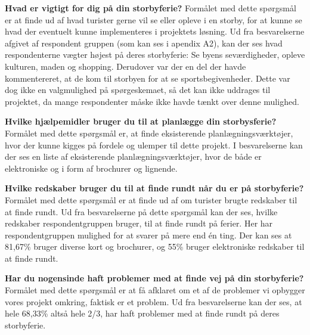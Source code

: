 \textbf{Hvad er vigtigt for dig på din storbyferie?}\newline
Formålet med dette spørgsmål er at finde ud af hvad turister gerne vil se eller opleve i en storby, for at kunne se hvad der eventuelt kunne implementeres i projektets løsning.\newline
Ud fra besvarelserne afgivet af respondent gruppen (som kan ses i apendix A2), kan der ses hvad respondenterne vægter højest på deres storbyferie: Se byens seværdigheder, opleve kulturen, maden og shopping. Derudover var der en del der havde kommentereret, at de kom til storbyen for at se sportsbegivenheder. Dette var dog ikke en valgmulighed på spørgeskemaet, så det kan ikke uddrages til projektet, da mange respondenter måske ikke havde tænkt over denne mulighed.\newline

\textbf{Hvilke hjælpemidler bruger du til at planlægge din storbysferie?}\newline
Formålet med dette spørgsmål er, at finde eksisterende planlægningsværktøjer, hvor der kunne kigges på fordele og ulemper til dette projekt.\newline 
I besvarelserne kan der ses en liste af eksisterende planlægningsværktøjer, hvor de både er elektroniske og i form af brochurer og lignende.\newline
 
\textbf{Hvilke redskaber bruger du til at finde rundt når du er på storbyferie?}\newline
Formålet med dette spørgsmål er at finde ud af om turister brugte redskaber til at finde rundt.\newline 
Ud fra besvarelserne på dette spørgsmål kan der ses, hvilke redskaber respondentgruppen bruger, til at finde rundt på ferier. Her har respondentgruppen mulighed for at svarer på mere end én ting. Der kan ses at 81,67\% bruger diverse kort og brochurer, og 55\% bruger elektroniske redskaber til at finde rundt. \newline

\textbf{Har du nogensinde haft problemer med at finde vej på din storbyferie?}\newline
Formålet med dette spørgsmål er at få afklaret om et af de problemer vi opbygger vores projekt omkring, faktisk er et problem.\newline
Ud fra besvarelserne kan der ses, at hele 68,33\% altså hele 2/3, har haft problemer med at finde rundt på deres storbyferie.\newline

